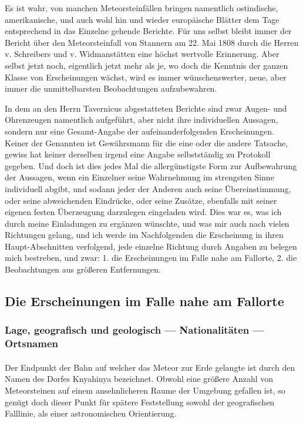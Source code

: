 \documentclass[a4paper, 11pt, oneside, german]{article}
\begin{document}
Es ist wahr, von manchen Meteorsteinfällen bringen namentlich ostindische, amerikanische, und auch wohl hin und wieder europäische Blätter dem Tage entsprechend in das Einzelne gehende Berichte. Für uns selbst bleibt immer der Bericht über den Meteorsteinfall von Stannern am 22. Mai 1808 durch die Herren v. Schreibers und v. Widmanstätten eine höchst wertvolle Erinnerung. Aber selbst jetzt noch, eigentlich jetzt mehr als je, wo doch die Kenntnis der ganzen Klasse von Erscheinungen wächst, wird es immer wünschenswerter, neue, aber immer die unmittelbarsten Beobachtungen aufzubewahren.

In dem an den Herrn Tavernicus abgestatteten Berichte sind zwar Augen- und Ohrenzeugen namentlich aufgeführt, aber nicht ihre individuellen Aussagen, sondern nur eine Gesamt-Angabe der aufeinanderfolgenden Erscheinungen. Keiner der Genannten ist Gewährsmann für die eine oder die andere Tatsache, gewiss hat keiner derselben irgend eine Angabe selbstständig zu Protokoll gegeben. Und doch ist dies jedes Mal die allergünstigste Form zur Aufbewahrung der Aussagen, wenn ein Einzelner seine Wahrnehmung im strengsten Sinne individuell abgibt, und sodann jeder der Anderen auch seine Übereinstimmung, oder seine abweichenden Eindrücke, oder seine Zusätze, ebenfalls mit seiner eigenen festen Überzeugung darzulegen eingeladen wird. Dies war es, was ich durch meine Einladungen zu ergänzen wünschte, und was mir auch nach vielen Richtungen gelang, und ich werde im Nachfolgenden die Erscheinung in ihren Haupt-Abschnitten verfolgend, jede einzelne Richtung durch Angaben zu belegen mich bestreben, und zwar: 1. die Erscheinungen im Falle nahe am Fallorte, 2. die Beobachtungen aus größeren Entfernungen.
\clearpage
\subsection{Die Erscheinungen im Falle nahe am Fallorte}
\subsubsection{Lage, geografisch und geologisch --- Nationalitäten --- Ortsnamen}
\paragraph{}
Der Endpunkt der Bahn auf welcher das Meteor zur Erde gelangte ist durch den Namen des Dorfes Knyahinya bezeichnet. Obwohl eine größere Anzahl von Meteorsteinen auf einem ansehnlicheren Raume der Umgebung gefallen ist, so genügt doch dieser Punkt für spätere Feststellung sowohl der geografischen Falllinie, als einer astronomischen Orientierung.
\end{document}
